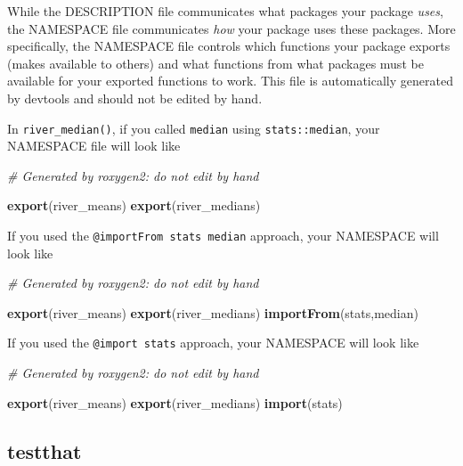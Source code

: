 \documentclass[
]{book}
\newenvironment{Shaded}{\begin{snugshade}}{\end{snugshade}}
\newcommand{\CommentTok}[1]{\textcolor[rgb]{0.56,0.35,0.01}{\textit{#1}}}
\newcommand{\KeywordTok}[1]{\textcolor[rgb]{0.13,0.29,0.53}{\textbf{#1}}}
\newcommand{\NormalTok}[1]{#1}
\begin{document}
While the DESCRIPTION file communicates what packages your package \emph{uses}, the NAMESPACE file communicates \emph{how} your package uses these packages. More specifically, the NAMESPACE file controls which functions your package exports (makes available to others) and what functions from what packages must be available for your exported functions to work. This file is automatically generated by devtools and should not be edited by hand.

In \texttt{river\_median()}, if you called \texttt{median} using \texttt{stats::median}, your NAMESPACE file will look like

\begin{Shaded}
\begin{Highlighting}[]
\CommentTok{# Generated by roxygen2: do not edit by hand}

\KeywordTok{export}\NormalTok{(river_means)}
\KeywordTok{export}\NormalTok{(river_medians)}
\end{Highlighting}
\end{Shaded}

If you used the \texttt{@importFrom\ stats\ median} approach, your NAMESPACE will look like

\begin{Shaded}
\begin{Highlighting}[]
\CommentTok{# Generated by roxygen2: do not edit by hand}

\KeywordTok{export}\NormalTok{(river_means)}
\KeywordTok{export}\NormalTok{(river_medians)}
\KeywordTok{importFrom}\NormalTok{(stats,median)}
\end{Highlighting}
\end{Shaded}

If you used the \texttt{@import\ stats} approach, your NAMESPACE will look like

\begin{Shaded}
\begin{Highlighting}[]
\CommentTok{# Generated by roxygen2: do not edit by hand}

\KeywordTok{export}\NormalTok{(river_means)}
\KeywordTok{export}\NormalTok{(river_medians)}
\KeywordTok{import}\NormalTok{(stats)}
\end{Highlighting}
\end{Shaded}

\hypertarget{testthat}{%
\subsection{testthat}\label{testthat}}
\end{document}
